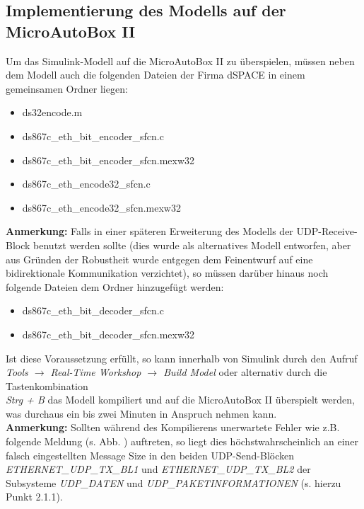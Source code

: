 \documentclass[fontsize = 12pt, paper = a4]{scrreprt}
\begin{document}
\subsection{Implementierung des Modells auf der MicroAutoBox II}

Um das Simulink-Modell auf die MicroAutoBox II zu überspielen, müssen neben dem Modell auch die folgenden Dateien der Firma dSPACE in einem gemeinsamen Ordner liegen: 

\begin{itemize}

\item ds32encode.m
\item ds867c\_eth\_bit\_encoder\_sfcn.c
\item ds867c\_eth\_bit\_encoder\_sfcn.mexw32
\item ds867c\_eth\_encode32\_sfcn.c
\item ds867c\_eth\_encode32\_sfcn.mexw32

\end{itemize}

\textbf{Anmerkung:} Falls in einer späteren Erweiterung des Modells der UDP-Receive-Block benutzt werden sollte (dies wurde als alternatives Modell entworfen, aber aus Gründen der Robustheit wurde entgegen dem Feinentwurf auf eine bidirektionale Kommunikation verzichtet), so müssen darüber hinaus noch folgende Dateien dem Ordner hinzugefügt werden:

\begin{itemize}


\item ds867c\_eth\_bit\_decoder\_sfcn.c
\item ds867c\_eth\_bit\_decoder\_sfcn.mexw32

\end{itemize}

Ist diese Voraussetzung erfüllt, so kann innerhalb von Simulink durch den Aufruf \\ \textit{Tools $\rightarrow$ Real-Time Workshop $\rightarrow$ Build Model} oder alternativ durch die Tastenkombination  \\ \textit{Strg + B} das Modell kompiliert und auf die MicroAutoBox II überspielt werden, was durchaus ein bis zwei Minuten in Anspruch nehmen kann. \\

\textbf{Anmerkung:} Sollten während des Kompilierens unerwartete Fehler wie z.B. folgende Meldung (s. Abb. ) auftreten, so liegt dies höchstwahrscheinlich an einer falsch eingestellten Message Size in den beiden UDP-Send-Blöcken \textit{ETHERNET\_UDP\_TX\_BL1} und \textit{ETHERNET\_UDP\_TX\_BL2} der Subsysteme \textit{UDP\_DATEN} und \textit{UDP\_PAKETINFORMATIONEN} (s. hierzu Punkt 2.1.1).
\end{document}

